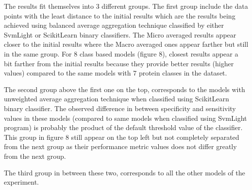 

The results fit themselves into 3 different groups.
The first group include the data points with the least distance to the initial results which are the results being 
achieved using balanced average aggregation technique classified by either SvmLight or ScikitLearn binary classifiers. 
The Micro averaged results appear closer to the initial results where the Macro averaged ones appear farther but 
still in the same group. For 8 class based models (figure 8), closest results appear a bit farther from the initial 
results because they provide better results (higher values) compared to the same models with 7 protein classes 
in the dataset.

The second group above the first one on the top, corresponds to the models with unweighted average aggregation technique when classified 
using ScikitLearn binary classifier. The observed difference in between specificity and sensitivity values in these models 
(compared to same models when classified using SvmLight program) is probably the product of the default threshold value 
of the classifier. This group in figure 8 still appear on the top left but not completely separated from the next group as their 
performance metric values does not differ greatly from the next group. 

The third group in between these two, corresponds to all the other models of the experiment.






